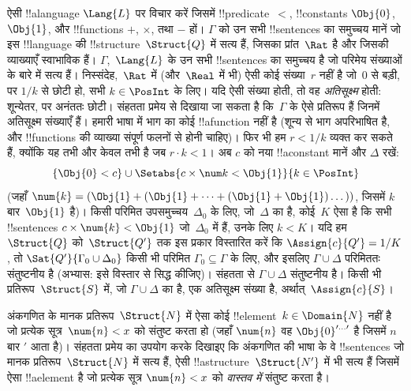\documentclass[../../../include/open-logic-section]{subfiles}
\begin{document}
{\begin{ex}
ऐसी !!a{language} $\Lang{L}$ पर विचार करें जिसमें !!{predicate}~$<$,
!!{constant}s $\Obj{0}$, $\Obj{1}$, और !!{function}s $+$, $\times$, तथा
$-$ हों। $\Gamma$ को उन सभी !!{sentence}s का समुच्चय मानें जो इस
!!{language} की !!{structure}~$\Struct{Q}$ में सत्य हैं, जिसका प्रांत~$\Rat$
है और जिसकी व्याख्याएँ स्वाभाविक हैं। $\Gamma$,~$\Lang{L}$ के उन सभी !!{sentence}s का समुच्चय है
जो परिमेय संख्याओं के बारे में सत्य हैं। निस्संदेह,~$\Rat$ में (और~$\Real$
में भी) ऐसी कोई संख्या~$r$ नहीं है जो~$0$ से बड़ी, पर $1/k$ से छोटी हो,
सभी $k \in \PosInt$ के लिए। यदि ऐसी संख्या होती, तो वह
\emph{अतिसूक्ष्म} होती: शून्येतर, पर अनंततः छोटी। संहतता प्रमेय से दिखाया
जा सकता है कि~$\Gamma$ के ऐसे प्रतिरूप हैं जिनमें अतिसूक्ष्म संख्याएँ हैं।
हमारी भाषा में भाग का कोई !!a{function} नहीं है (शून्य से भाग अपरिभाषित है,
और !!{function}s की व्याख्या संपूर्ण फलनों से होनी चाहिए)। फिर भी हम
$r < 1/k$ व्यक्त कर सकते हैं, क्योंकि यह तभी और केवल तभी है जब
$r \cdot k < 1$। अब $c$ को नया !!a{constant} मानें और $\Delta$ रखें:
\[
\{\Obj{0} < c\}
\cup \Setabs{ c \times \num k < \Obj{1} }{k \in \PosInt}
\]
(जहाँ $\num{k} = (\Obj{1} + (\Obj{1} + \dots + (\Obj{1} +
\Obj{1})\dots))$, जिसमें $k$ बार~$\Obj{1}$ है)। किसी परिमित
उपसमुच्चय~$\Delta_0$ के लिए, जो~$\Delta$ का है, कोई~$K$ ऐसा है कि सभी
!!{sentence}s $c \times \num{k} < \Obj{1}$ जो~$\Delta_0$ में हैं, उनके
लिए $k < K$। यदि हम
$\Struct{Q}$ को~$\Struct{Q'}$ तक इस प्रकार विस्तारित करें कि
$\Assign{c}{Q'} = 1/K$, तो $\Sat{Q'}{\Gamma_0 \cup \Delta_0}$ किसी भी
परिमित $\Gamma_0 \subseteq \Gamma$ के लिए, और इसलिए $\Gamma \cup \Delta$
परिमिततः संतुष्टनीय है (अभ्यास: इसे विस्तार से सिद्ध कीजिए)। संहतता से
$\Gamma
\cup \Delta$ संतुष्टनीय है। किसी भी प्रतिरूप~$\Struct{S}$ में, जो
$\Gamma \cup
\Delta$ का है, एक अतिसूक्ष्म संख्या है,
अर्थात्~$\Assign{c}{S}$।
\end{ex}
}{}

\begin{prob}
अंकगणित के मानक प्रतिरूप~$\Struct{N}$ में ऐसा कोई !!{element}~$k \in \Domain{N}$
नहीं है जो प्रत्येक सूत्र~$\num{n}
< x$ को संतुष्ट करता हो (जहाँ $\num{n}$ वह $\Obj{0}^{\prime\dots\prime}$ है
जिसमें $n$ बार $\prime$ आता है)। संहतता प्रमेय का उपयोग करके दिखाइए कि
अंकगणित की भाषा के वे !!{sentence}s जो मानक प्रतिरूप~$\Struct{N}$ में सत्य
हैं, ऐसी !!a{structure}~$\Struct{N'}$ में भी सत्य हैं जिसमें ऐसा
!!a{element} है जो प्रत्येक सूत्र $\num{n} < x$ को \emph{वास्तव में}
संतुष्ट करता है।
\end{prob}
\tagendprob
\end{document}
